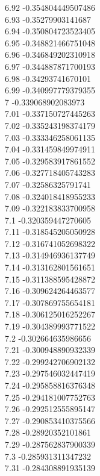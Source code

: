 {6.92	-0.354804449507486\\
6.93	-0.35279903141687\\
6.94	-0.350804723523405\\
6.95	-0.348821466751048\\
6.96	-0.346849202310918\\
6.97	-0.344887871700193\\
6.98	-0.34293741670101\\
6.99	-0.340997779379355\\
7	-0.339068902083973\\
7.01	-0.337150727445263\\
7.02	-0.335243198374179\\
7.03	-0.333346258061135\\
7.04	-0.331459849974911\\
7.05	-0.329583917861552\\
7.06	-0.327718405743283\\
7.07	-0.32586325791741\\
7.08	-0.324018418955233\\
7.09	-0.322183833700958\\
7.1	-0.320359447270605\\
7.11	-0.318545205050928\\
7.12	-0.316741052698322\\
7.13	-0.314946936137749\\
7.14	-0.313162801561651\\
7.15	-0.311388595428872\\
7.16	-0.309624264463577\\
7.17	-0.307869755654181\\
7.18	-0.306125016252267\\
7.19	-0.304389993771522\\
7.2	-0.302664635986656\\
7.21	-0.300948890932339\\
7.22	-0.299242706902132\\
7.23	-0.297546032447419\\
7.24	-0.295858816376348\\
7.25	-0.294181007752763\\
7.26	-0.292512555895147\\
7.27	-0.290853410375566\\
7.28	-0.28920352101861\\
7.29	-0.287562837900339\\
7.3	-0.285931311347232\\
7.31	-0.284308891935139\\
}
